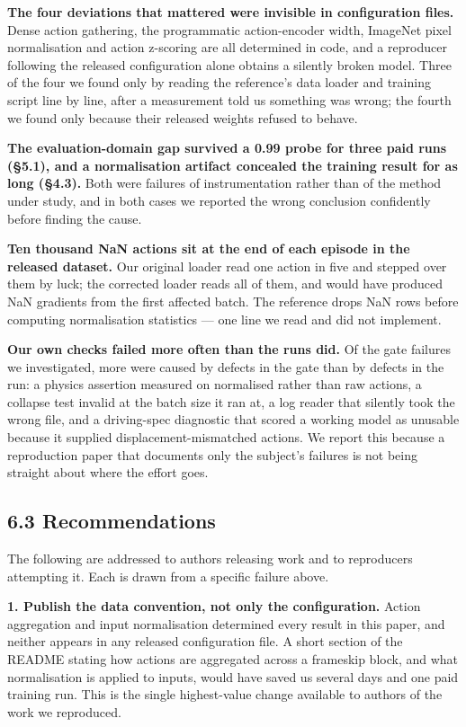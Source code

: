 \documentclass[10pt]{article}
\begin{document}
\textbf{The four deviations that mattered were invisible in configuration files.}
Dense action gathering, the programmatic action-encoder width, ImageNet pixel
normalisation and action z-scoring are all determined in code, and a reproducer
following the released configuration alone obtains a silently broken model.
Three of the four we found only by reading the reference's data loader and
training script line by line, after a measurement told us something was wrong;
the fourth we found only because their released weights refused to behave.

\textbf{The evaluation-domain gap survived a 0.99 probe for three paid runs (\S{}5.1),
and a normalisation artifact concealed the training result for as long
(\S{}4.3).} Both were failures of instrumentation rather than of the method under
study, and in both cases we reported the wrong conclusion confidently before
finding the cause.

\textbf{Ten thousand NaN actions sit at the end of each episode in the released
dataset.} Our original loader read one action in five and stepped over them by
luck; the corrected loader reads all of them, and would have produced NaN
gradients from the first affected batch. The reference drops NaN rows before
computing normalisation statistics --- one line we read and did not implement.

\textbf{Our own checks failed more often than the runs did.} Of the gate failures we
investigated, more were caused by defects in the gate than by defects in the
run: a physics assertion measured on normalised rather than raw actions, a
collapse test invalid at the batch size it ran at, a log reader that silently
took the wrong file, and a driving-spec diagnostic that scored a working model
as unusable because it supplied displacement-mismatched actions. We report this
because a reproduction paper that documents only the subject's failures is not
being straight about where the effort goes.

\subsection{6.3 Recommendations}\label{recommendations}

The following are addressed to authors releasing work and to reproducers
attempting it. Each is drawn from a specific failure above.

\textbf{1. Publish the data convention, not only the configuration.} Action
aggregation and input normalisation determined every result in this paper, and
neither appears in any released configuration file. A short section of the
README stating how actions are aggregated across a frameskip block, and what
normalisation is applied to inputs, would have saved us several days and one
paid training run. This is the single highest-value change available to authors
of the work we reproduced.
\end{document}
